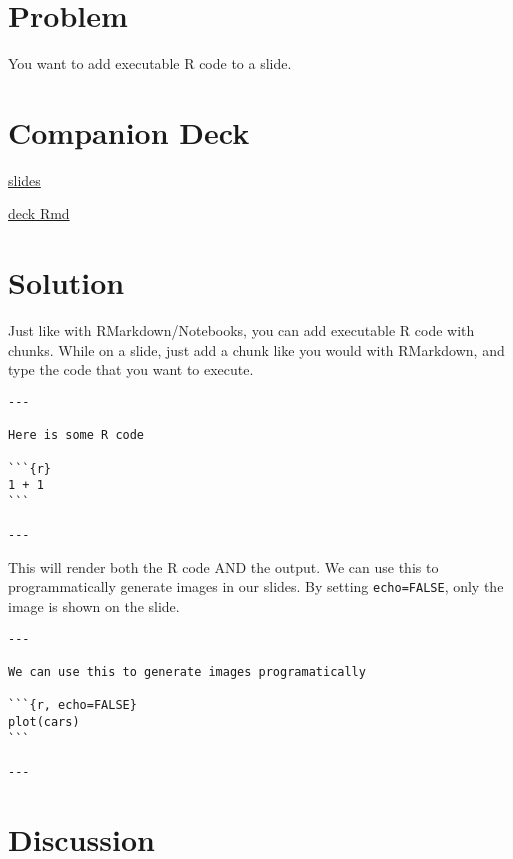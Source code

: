 \documentclass[]{book}
\theoremstyle{definition}
\theoremstyle{definition}
\theoremstyle{definition}
\theoremstyle{remark}
\begin{document}
\hypertarget{problem-3}{%
\section{Problem}\label{problem-3}}

You want to add executable R code to a slide.

\hypertarget{companion-deck-3}{%
\section{Companion Deck}\label{companion-deck-3}}

\href{http://xaringan-field-guide-companion.davisvaughan.com/04-r-chunk/r-chunk.html\#1}{slides}

\href{https://github.com/DavisVaughan/xaringanrecipes-companion/tree/master/04-r-chunk}{deck
Rmd}

\hypertarget{solution-3}{%
\section{Solution}\label{solution-3}}

Just like with RMarkdown/Notebooks, you can add executable R code with
chunks. While on a slide, just add a chunk like you would with
RMarkdown, and type the code that you want to execute.

\begin{verbatim}
---

Here is some R code

```{r}
1 + 1
```

---
\end{verbatim}

This will render both the R code AND the output. We can use this to
programmatically generate images in our slides. By setting
\texttt{echo=FALSE}, only the image is shown on the slide.

\begin{verbatim}
---

We can use this to generate images programatically

```{r, echo=FALSE}
plot(cars)
```

---
\end{verbatim}

\hypertarget{discussion-3}{%
\section{Discussion}\label{discussion-3}}


\end{document}
